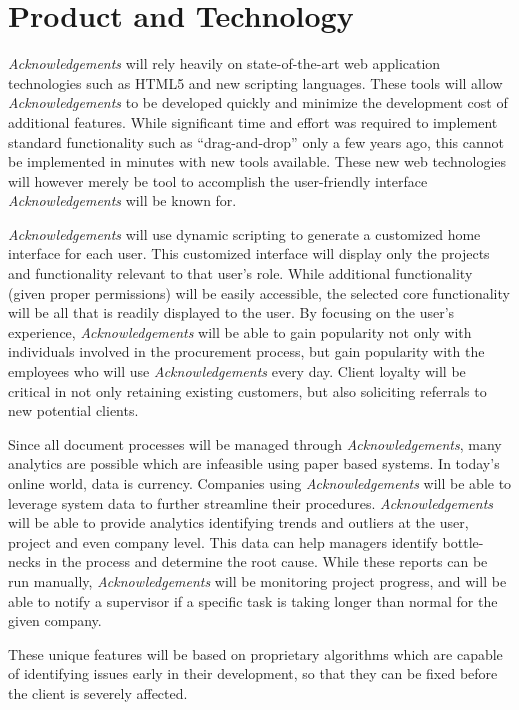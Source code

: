 \section{Product and Technology}
{\it Acknowledgements} will rely heavily on state-of-the-art web application technologies such as HTML5 and new scripting languages. These tools will allow {\it Acknowledgements} to be developed quickly and minimize the development cost of additional features. While significant time and effort was required to implement standard functionality such as ``drag-and-drop'' only a few years ago, this cannot be implemented in minutes with new tools available. These new web technologies will however merely be tool to accomplish the user-friendly interface {\it Acknowledgements} will be known for.

{\it Acknowledgements} will use dynamic scripting to generate a customized home interface for each user. This customized interface will display only the projects and functionality relevant to that user's role. While additional functionality (given proper permissions) will be easily accessible, the selected core functionality will be all that is readily displayed to the user. By focusing on the user's experience, {\it Acknowledgements} will be able to gain popularity not only with individuals involved in the procurement process, but gain popularity with the employees who will use {\it Acknowledgements} every day. Client loyalty will be critical in not only retaining existing customers, but also soliciting referrals to new potential clients.

Since all document processes will be managed through {\it Acknowledgements}, many analytics are possible which are infeasible using paper based systems. In today's online world, data is currency. Companies using {\it Acknowledgements} will be able to leverage system data to further streamline their procedures. {\it Acknowledgements} will be able to provide analytics identifying trends and outliers at the user, project and even company level. This data can help managers identify bottle-necks in the process and determine the root cause. While these reports can be run manually, {\it Acknowledgements} will be monitoring project progress, and will be able to notify a supervisor if a specific task is taking longer than normal for the given company.

These unique features will be based on proprietary algorithms which are capable of identifying issues early in their development, so that they can be fixed before the client is severely affected.
